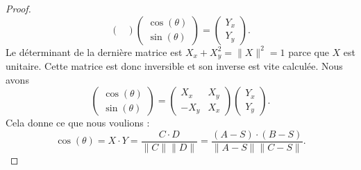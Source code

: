 \begin{proof}
\begin{equation}
\begin{pmatrix}
        \end{pmatrix}\begin{pmatrix}
            \cos(\theta)    \\ 
            \sin(\theta)    
        \end{pmatrix}=\begin{pmatrix}
            Y_x    \\ 
            Y_y    
        \end{pmatrix}.
    \end{equation}
    Le déterminant de la dernière matrice est \( X_x+X_y^2=\| X \|^2=1\) parce que \( X\) est unitaire. Cette matrice est donc inversible et son inverse est vite calculée. Nous avons
    \begin{equation}
        \begin{pmatrix}
            \cos(\theta)    \\ 
            \sin(\theta)    
        \end{pmatrix}=\begin{pmatrix}
            X_x    &   X_y    \\ 
            -X_y    &   X_x    
        \end{pmatrix}\begin{pmatrix}
            Y_x    \\ 
            Y_y    
        \end{pmatrix}.
    \end{equation}
    Cela donne ce que nous voulions :
    \begin{equation}
        \cos(\theta)=X\cdot Y=\frac{ C\cdot D }{ \| C \|\| D \| }=\frac{ (A-S)\cdot(B-S) }{ \| A-S \|\| C-S \| }.
    \end{equation}
\end{proof}
